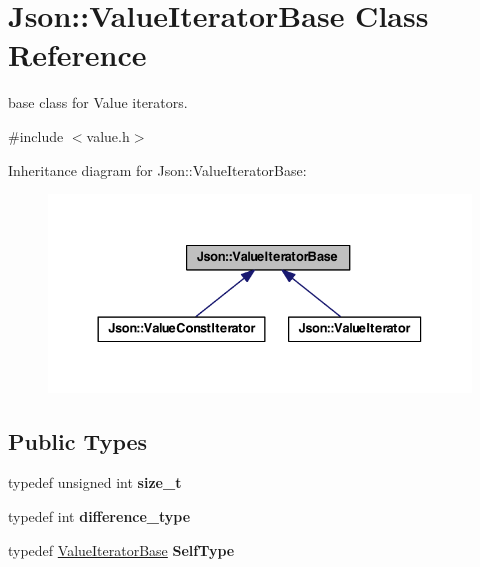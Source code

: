 \hypertarget{class_json_1_1_value_iterator_base}{\section{Json\-:\-:Value\-Iterator\-Base Class Reference}
\label{class_json_1_1_value_iterator_base}
}


base class for Value iterators.  




{\ttfamily \#include $<$value.\-h$>$}



Inheritance diagram for Json\-:\-:Value\-Iterator\-Base\-:
\nopagebreak
\begin{figure}[H]
\begin{center}
\leavevmode
\includegraphics[width=333pt]{class_json_1_1_value_iterator_base__inherit__graph}
\end{center}
\end{figure}
\subsection*{Public Types}
\begin{DoxyCompactItemize}
\item 
\hypertarget{class_json_1_1_value_iterator_base_a9d3a3c7ce5cdefe23cb486239cf07bb5}{typedef unsigned int {\bfseries size\-\_\-t}}\label{class_json_1_1_value_iterator_base_a9d3a3c7ce5cdefe23cb486239cf07bb5}

\item 
\hypertarget{class_json_1_1_value_iterator_base_a4e44bf8cbd17ec8d6e2c185904a15ebd}{typedef int {\bfseries difference\-\_\-type}}\label{class_json_1_1_value_iterator_base_a4e44bf8cbd17ec8d6e2c185904a15ebd}

\item 
\hypertarget{class_json_1_1_value_iterator_base_a9d2a940d03ea06d20d972f41a89149ee}{typedef \hyperlink{class_json_1_1_value_iterator_base}{Value\-Iterator\-Base} {\bfseries Self\-Type}}\label{class_json_1_1_value_iterator_base_a9d2a940d03ea06d20d972f41a89149ee}

\end{DoxyCompactItemize}

